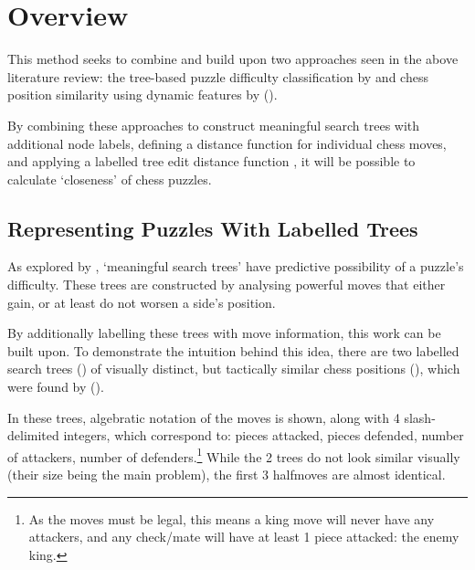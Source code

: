 \section{Overview}\label{treeS1}

This method seeks to combine and build upon two approaches seen in the above
literature review: the tree-based puzzle difficulty classification by
\citet{chessTrees} and chess position similarity using dynamic features by
\citet{chessMotifs} ().

By combining these approaches to construct meaningful search trees with
additional node labels, defining a distance function for individual chess
moves, and applying a labelled tree edit distance function
\citep{editDistTrees}, it will be possible to calculate `closeness' of chess
puzzles. 

\subsection{Representing Puzzles With Labelled Trees}\label{treeS11}

As explored by \citet{chessTrees}, `meaningful search trees' have predictive
possibility of a puzzle's difficulty. These trees are constructed by analysing
powerful moves that either gain, or at least do not worsen a side's position. 

By additionally labelling these trees with move information, this work can be
built upon. To demonstrate the intuition behind this idea, there are two
labelled search trees () of visually distinct, but tactically
similar chess positions (), which were found by
\citet{chessLanguage} (). 

In these trees, algebratic notation of the moves is shown, along with 4
slash-delimited integers, which correspond to: pieces attacked, pieces
defended, number of attackers, number of defenders.\footnote{As the moves must
be legal, this means a king move will never have any attackers, and any
check/mate will have at least 1 piece attacked: the enemy king.} While the 2
trees do not look similar visually (their size being the main problem), the
first 3 halfmoves are almost identical. 

